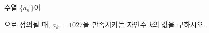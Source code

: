 \hspace*{2mm}\begin{minipage}[t]{\dimexpr\linewidth-2mm\relax}\vspace{0pt}
수열 $\{a_n\}$이 \par\smallskip{}\par\smallskip\noindent 으로 정의될 때, $a_k=1027$을 만족시키는 자연수 $k$의 값을 구하시오.\end{minipage}
